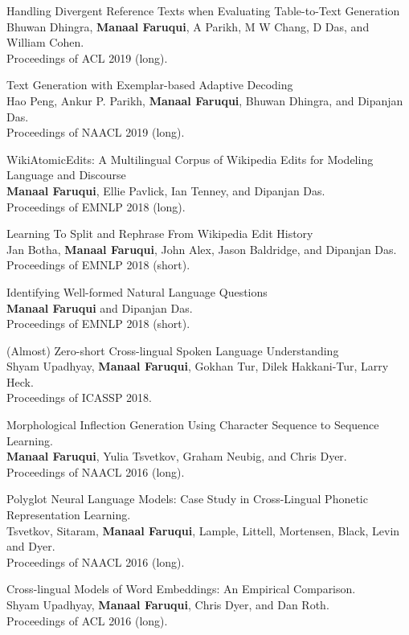 \documentclass[margin,line]{res}
\begin{document}
\begin{resume}
Handling Divergent Reference Texts when Evaluating Table-to-Text Generation\\
Bhuwan Dhingra, \textbf{Manaal Faruqui}, A Parikh, M W Chang, D Das, and William Cohen.\\
Proceedings of ACL 2019 (long).

Text Generation with Exemplar-based Adaptive Decoding\\
Hao Peng, Ankur P. Parikh, \textbf{Manaal Faruqui}, Bhuwan Dhingra, and Dipanjan Das.\\
Proceedings of NAACL 2019 (long).

WikiAtomicEdits: A Multilingual Corpus of Wikipedia Edits for Modeling Language and Discourse\\
\textbf{Manaal Faruqui}, Ellie Pavlick, Ian Tenney, and Dipanjan Das.\\
Proceedings of EMNLP 2018 (long).

Learning To Split and Rephrase From Wikipedia Edit History\\
Jan Botha, \textbf{Manaal Faruqui}, John Alex, Jason Baldridge, and Dipanjan Das.\\
Proceedings of EMNLP 2018 (short).

Identifying Well-formed Natural Language Questions\\
\textbf{Manaal Faruqui} and Dipanjan Das.\\
Proceedings of EMNLP 2018 (short).

(Almost) Zero-short Cross-lingual Spoken Language Understanding\\
Shyam Upadhyay, \textbf{Manaal Faruqui}, Gokhan Tur, Dilek Hakkani-Tur, Larry Heck.\\
Proceedings of ICASSP 2018.

Morphological Inflection Generation Using Character Sequence to Sequence Learning.\\
\textbf{Manaal Faruqui}, Yulia Tsvetkov, Graham Neubig, and Chris Dyer.\\
Proceedings of NAACL 2016 (long).

Polyglot Neural Language Models: Case Study in Cross-Lingual Phonetic Representation Learning.\\
Tsvetkov, Sitaram, \textbf{Manaal Faruqui}, Lample, Littell, Mortensen, Black,  Levin and Dyer.\\
Proceedings of NAACL 2016 (long).

Cross-lingual Models of Word Embeddings: An Empirical Comparison.\\
Shyam Upadhyay, \textbf{Manaal Faruqui}, Chris Dyer, and Dan Roth.\\
Proceedings of ACL 2016 (long).


\end{resume}
\end{document}
